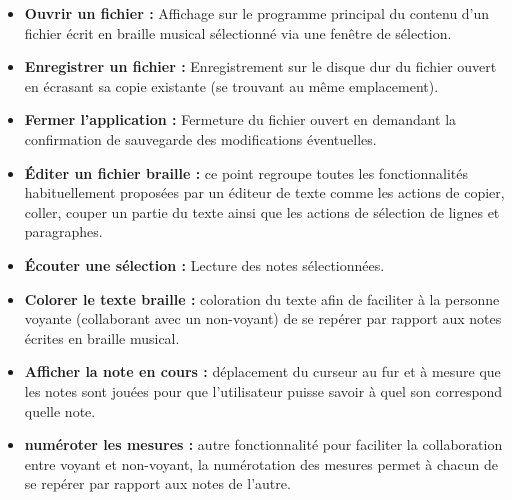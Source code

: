 \begin{itemize}
  \item[\textbullet] \textbf{Ouvrir un fichier :} Affichage sur le programme principal du contenu d'un fichier écrit en braille musical sélectionné via une fenêtre de sélection.\\
  \item[\textbullet] \textbf{Enregistrer un fichier :} Enregistrement sur le disque dur du fichier ouvert en écrasant sa copie existante (se trouvant au même emplacement).\\
  \item[\textbullet] \textbf{Fermer l'application :} Fermeture du fichier ouvert en demandant la confirmation de sauvegarde des modifications éventuelles.\\
  \item[\textbullet] \textbf{Éditer un fichier braille :} ce point regroupe toutes les fonctionnalités habituellement proposées par un éditeur de texte comme les actions de copier, coller, couper un partie du texte ainsi que les actions de sélection de lignes et paragraphes.\\
  \item[\textbullet] \textbf{Écouter une sélection :} Lecture des notes sélectionnées.\\
  \item[\textbullet] \textbf{Colorer le texte braille :} coloration du texte afin de faciliter à la personne voyante (collaborant avec un non-voyant) de se repérer par rapport aux notes écrites en braille musical.\\
  \item[\textbullet] \textbf{Afficher la note en cours :} déplacement du curseur au fur et à mesure que les notes sont jouées pour que l'utilisateur puisse savoir à quel son correspond quelle note.\\
  \item[\textbullet] \textbf{numéroter les mesures :} autre fonctionnalité pour faciliter la collaboration entre voyant et non-voyant, la numérotation des mesures permet à chacun de se repérer par rapport aux notes de l'autre.\\
\end{itemize}

